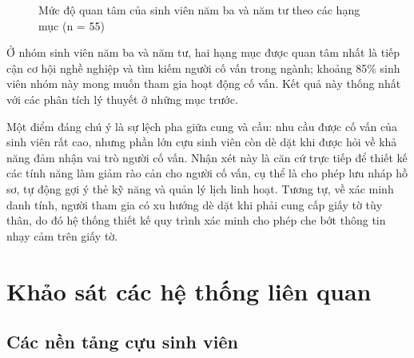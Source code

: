 \documentclass[12pt,a4paper,oneside]{report}
\begin{document}
\begin{figure}[H]\centering
{}
\caption{Mức độ quan tâm của sinh viên năm ba và năm tư theo các hạng mục (n = 55)}
\label{fig:surveychart}
\end{figure}

Ở nhóm sinh viên năm ba và năm tư, hai hạng mục được quan tâm nhất là tiếp cận cơ hội nghề nghiệp và tìm kiếm người cố vấn trong ngành; khoảng 85\% sinh viên nhóm này mong muốn tham gia hoạt động cố vấn. Kết quả này thống nhất với các phân tích lý thuyết ở những mục trước.

Một điểm đáng chú ý là sự lệch pha giữa cung và cầu: nhu cầu được cố vấn của sinh viên rất cao, nhưng phần lớn cựu sinh viên còn dè dặt khi được hỏi về khả năng đảm nhận vai trò người cố vấn. Nhận xét này là căn cứ trực tiếp để thiết kế các tính năng làm giảm rào cản cho người cố vấn, cụ thể là cho phép lưu nháp hồ sơ, tự động gợi ý thẻ kỹ năng và quản lý lịch linh hoạt. Tương tự, về xác minh danh tính, người tham gia có xu hướng dè dặt khi phải cung cấp giấy tờ tùy thân, do đó hệ thống thiết kế quy trình xác minh cho phép che bớt thông tin nhạy cảm trên giấy tờ.

\section{Khảo sát các hệ thống liên quan}

\subsection{Các nền tảng cựu sinh viên}
\end{document}
